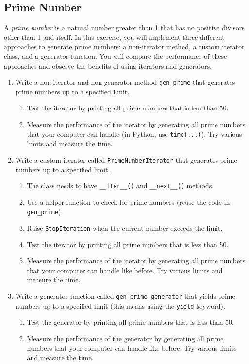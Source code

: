 \documentclass[oneside,11pt,dvipsnames]{book}
\newcommand{\code}[1]{\texttt{#1}}
\begin{document}
\subsection{Prime Number}\label{exercise:prime-number}

A \emph{prime number} is a natural number greater than 1 that has no positive divisors other than 1 and itself. In this exercise, you will implement three different approaches to generate prime numbers: a non-iterator method, a custom iterator class, and a generator function. You will compare the performance of these approaches and observe the benefits of using iterators and generators.

\begin{enumerate}
    
    \item Write a non-iterator and non-generator method \code{gen\_prime} that generates prime numbers up to a specified limit.
    \begin{enumerate}
    \item Test the iterator by printing all prime numbers that is less than 50.
    \item Measure the performance of the iterator by generating all prime numbers that your computer can handle (in Python, use \code{time(...)}).  Try various limits and measure the time.
    \end{enumerate}

\item Write a custom iterator called \code{PrimeNumberIterator} that generates prime numbers up to a specified limit.
\begin{enumerate}
    \item The class needs to have \code{\_\_iter\_\_()} and \code{\_\_next\_\_()} methods.
    \item Use a helper function to check for prime numbers (reuse the code in \code{gen\_prime}).
    \item Raise \code{StopIteration} when the current number exceeds the limit.
    \item Test the iterator by printing all prime numbers that is less than 50.
    \item Measure the performance of the iterator by generating all prime numbers that your computer can handle like before.  Try various limits and measure the time.
\end{enumerate}
\item Write a generator function called \code{gen\_prime\_generator} that yields prime numbers up to a specified limit (this means using the \code{yield} keyword).
\begin{enumerate}
    \item Test the generator by printing all prime numbers that is less than 50.
    \item Measure the performance of the generator by generating all prime numbers that your computer can handle like before.  Try various limits and measure the time.
\end{enumerate}
\end{enumerate}
\end{document}

